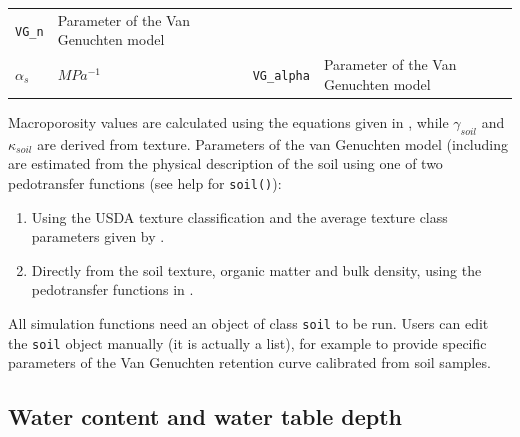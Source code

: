 \documentclass[]{book}
\providecommand{\tightlist}{%
  \setlength{\itemsep}{0pt}\setlength{\parskip}{0pt}}
\begin{document}
\begin{longtable}[]{@{}llll@{}}
\begin{minipage}[t]{0.06\columnwidth}
\texttt{VG\_n}\strut
\end{minipage} & \begin{minipage}[t]{0.53\columnwidth}\raggedright\strut
Parameter of the Van Genuchten \citeyearpar{Genuchten1980} model\strut
\end{minipage}\tabularnewline
\begin{minipage}[t]{0.11\columnwidth}\raggedright\strut
\(\alpha_s\)\strut
\end{minipage} & \begin{minipage}[t]{0.10\columnwidth}\raggedright\strut
\(MPa^{-1}\)\strut
\end{minipage} & \begin{minipage}[t]{0.06\columnwidth}\raggedright\strut
\texttt{VG\_alpha}\strut
\end{minipage} & \begin{minipage}[t]{0.53\columnwidth}\raggedright\strut
Parameter of the Van Genuchten \citeyearpar{Genuchten1980} model\strut
\end{minipage}\tabularnewline
\bottomrule
\end{longtable}

Macroporosity values are calculated using the equations given in
\citet{Stolf2011}, while \(\gamma_{soil}\) and \(\kappa_{soil}\) are
derived from texture. Parameters of the van Genuchten model (including
are estimated from the physical description of the soil using one of two
pedotransfer functions (see help for \texttt{soil()}):

\begin{enumerate}
\def\labelenumi{\arabic{enumi}.}
\tightlist
\item
  Using the USDA texture classification and the average texture class
  parameters given by \citet{Carsel1988}.
\item
  Directly from the soil texture, organic matter and bulk density, using
  the pedotransfer functions in \citet{Toth2015}.
\end{enumerate}

All simulation functions need an object of class \texttt{soil} to be
run. Users can edit the \texttt{soil} object manually (it is actually a
list), for example to provide specific parameters of the Van Genuchten
retention curve calibrated from soil samples.

\subsection{Water content and water table
depth}\label{water-content-and-water-table-depth}
\end{document}
